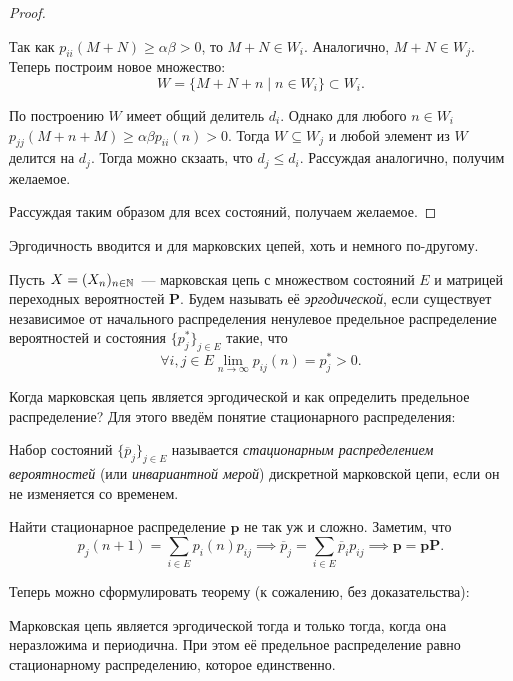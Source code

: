 \begin{proof}
\begin{enumerate}
		Так как \(p_{ii}(M + N) \geq \alpha\beta > 0\), то \(M + N \in W_{i}\). 
		Аналогично, \(M + N \in W_{j}\). Теперь построим новое множество:
		\[
			W = \{M + N + n \mid n \in W_{i}\} \subset W_{i}.
		\]
		
		По построению \(W\) имеет общий делитель \(d_{i}\). Однако для 
		любого \(n \in W_{i}\) \(p_{jj}(M + n + M) \geq \alpha\beta p_{ii}(n) > 
		0\). Тогда \(W \subseteq W_{j}\) и любой элемент из \(W\) делится на 
		\(d_{j}\). Тогда можно скзаать, что \(d_{j} \leq d_{i}\). Рассуждая 
		аналогично, получим желаемое.
	\end{enumerate}

	Рассуждая таким образом для всех состояний, получаем желаемое.
\end{proof}

Эргодичность вводится и для марковских цепей, хоть и немного по-другому.
\begin{definition}
	Пусть \(X = (X_{n})_{n \in \mathbb{N}}\)~--- марковская цепь с множеством состояний 
	\(E\) и матрицей переходных вероятностей \(\mathbf{P}\). Будем называть её 
	\emph{эргодической}, если существует независимое от начального 
	распределения ненулевое предельное распределение вероятностей и состояния 
	\(\{p_{j}^{*}\}_{j \in E}\) такие, что
	\[
		\forall i,j \in E \lim\limits_{n \to \infty} p_{ij}(n) = p_{j}^{*} > 0.
	\]
\end{definition}

Когда марковская цепь является эргодической и как определить предельное 
распределение? Для этого введём понятие стационарного распределения:
\begin{definition}
	Набор состояний \(\{\overline{p}_{j}\}_{j \in E}\) называется 
	\emph{стационарным распределением вероятностей} (или \emph{инвариантной 
	мерой}) дискретной марковской цепи, если он не изменяется со временем.
\end{definition}
Найти стационарное распределение \(\mathbf{p}\) не так уж и сложно. Заметим, что
\[
	p_{j}(n + 1) = \sum_{i \in E} p_{i}(n)p_{ij} \implies \overline{p}_{j} = 
	\sum_{i \in E} \overline{p}_{i}p_{ij} \implies \mathbf{p} = \mathbf{pP}.
\]

Теперь можно сформулировать теорему (к сожалению, без доказательства):
\begin{theorem}
	Марковская цепь является эргодической тогда и только тогда, когда она 
	неразложима и периодична. При этом её предельное распределение равно 
	стационарному распределению, которое единственно.
\end{theorem}

